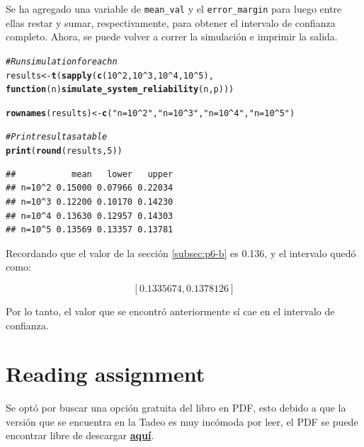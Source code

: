 \documentclass[12pt]{article}\usepackage[]{graphicx}\usepackage[]{xcolor}
\makeatletter
\newcommand{\hlnum}[1]{\textcolor[rgb]{0.686,0.059,0.569}{#1}}%
\newcommand{\hlsng}[1]{\textcolor[rgb]{0.192,0.494,0.8}{#1}}%
\newcommand{\hlcom}[1]{\textcolor[rgb]{0.678,0.584,0.686}{\textit{#1}}}%
\newcommand{\hlopt}[1]{\textcolor[rgb]{0,0,0}{#1}}%
\newcommand{\hldef}[1]{\textcolor[rgb]{0.345,0.345,0.345}{#1}}%
\newcommand{\hlkwa}[1]{\textcolor[rgb]{0.161,0.373,0.58}{\textbf{#1}}}%
\newcommand{\hlkwb}[1]{\textcolor[rgb]{0.69,0.353,0.396}{#1}}%
\newcommand{\hlkwc}[1]{\textcolor[rgb]{0.333,0.667,0.333}{#1}}%
\newcommand{\hlkwd}[1]{\textcolor[rgb]{0.737,0.353,0.396}{\textbf{#1}}}%
\newenvironment{kframe}{%
 \def\at@end@of@kframe{}%
 \ifinner\ifhmode%
  \def\at@end@of@kframe{\end{minipage}}%
  \begin{minipage}{\columnwidth}%
 \fi\fi%
 \def\FrameCommand##1{\hskip\@totalleftmargin \hskip-\fboxsep
 \colorbox{shadecolor}{##1}\hskip-\fboxsep
     \hskip-\linewidth \hskip-\@totalleftmargin \hskip\columnwidth}%
 \MakeFramed {\advance\hsize-\width
   \@totalleftmargin\z@ \linewidth\hsize
   \@setminipage}}%
 {\par\unskip\endMakeFramed%
 \at@end@of@kframe}
\newenvironment{knitrout}{}{} %
\makeatother
\begin{document}
Se ha agregado una variable de \lstinline|mean_val| y el \lstinline|error_margin| para luego entre ellas restar y sumar, respectivamente, para obtener el intervalo de confianza completo. Ahora, se puede volver a correr la simulación e imprimir la salida.


\begin{knitrout}
\color{fgcolor}\begin{kframe}
\begin{alltt}
\hlcom{# Run simulation for each n}
\hldef{results} \hlkwb{<-} \hlkwd{t}\hldef{(}\hlkwd{sapply}\hldef{(}\hlkwd{c}\hldef{(}\hlnum{10}\hlopt{^}\hlnum{2}\hldef{,} \hlnum{10}\hlopt{^}\hlnum{3}\hldef{,} \hlnum{10}\hlopt{^}\hlnum{4}\hldef{,} \hlnum{10}\hlopt{^}\hlnum{5}\hldef{),}
                  \hlkwa{function}\hldef{(}\hlkwc{n}\hldef{)} \hlkwd{simulate_system_reliability}\hldef{(n, p)))}

\hlkwd{rownames}\hldef{(results)} \hlkwb{<-} \hlkwd{c}\hldef{(}\hlsng{"n=10^2"}\hldef{,} \hlsng{"n=10^3"}\hldef{,} \hlsng{"n=10^4"}\hldef{,} \hlsng{"n=10^5"}\hldef{)}

\hlcom{# Print result as a table}
\hlkwd{print}\hldef{(}\hlkwd{round}\hldef{(results,} \hlnum{5}\hldef{))}
\end{alltt}
\begin{verbatim}
##           mean   lower   upper
## n=10^2 0.15000 0.07966 0.22034
## n=10^3 0.12200 0.10170 0.14230
## n=10^4 0.13630 0.12957 0.14303
## n=10^5 0.13569 0.13357 0.13781
\end{verbatim}
\end{kframe}
\end{knitrout}

Recordando que el valor de la sección \ref{subsec:p6-b} es 0.136, y el intervalo quedó como:
 
\[
[0.1335674, 0.1378126 ]
\]

Por lo tanto, el valor que se encontró anteriormente sí cae en el intervalo de confianza.


\section{Reading assignment}

Se optó por buscar una opción gratuita del libro en PDF, esto debido a que la versión que se encuentra en la Tadeo es muy incómoda por leer, el PDF se puede encontrar libre de descargar \href{https://www.academia.edu/114463674/Practical_Statistics_for_Data_Scientists_50_Essential_Concepts_Using_R_and_Python_by_Peter_Bruce_Andrew_Bruce_Peter_Gedeck}{\textbf{aquí}}.

\printbibliography
\end{document}
